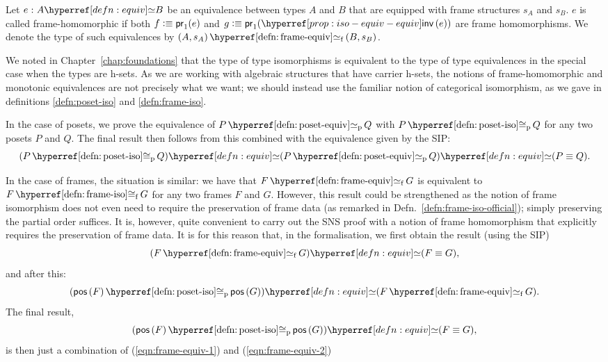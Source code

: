 \begin{defn}\label{defn:frame-equiv}
  Let $\oftyI{e}{\typequiv{A}{B}}$ be an equivalence between types $A$ and $B$ that are
  equipped with frame structures $s_A$ and $s_B$. $e$ is called frame-homomorphic if both
  $f \vcentcolon\equiv \mathsf{pr}_1(e)$ and $g \is \mathsf{pr}_1(\invequiv{e})$ are frame
  homomorphisms. We denote the type of such equivalences by
  $\frameequiv{(A, s_A)}{(B , s_B)}$.
\end{defn}

We noted in Chapter~\ref{chap:foundations} that the type of type isomorphisms is
equivalent to the type of type equivalences in the special case when the types are h-sets.
As we are working with algebraic structures that have carrier h-sets, the notions of
frame-homomorphic and monotonic equivalences are not precisely what we want; we should
instead use the familiar notion of categorical isomorphism, as we gave in definitions
\ref{defn:poset-iso} and \ref{defn:frame-iso}.

In the case of posets, we prove the equivalence of $\posetequiv{P}{Q}$ with
$\posetiso{P}{Q}$ for any two posets $P$ and $Q$. The final result then follows from this
combined with the equivalence given by the SIP:
\begin{equation*}
  \typequiv{(\posetiso{P}{Q})}{\typequiv{(\posetequiv{P}{Q})}{(P \equiv Q)}}.
\end{equation*}

In the case of frames, the situation is similar: we have that $\frameequiv{F}{G}$ is
equivalent to $\frameiso{F}{G}$ for any two frames $F$ and $G$. However, this result could
be strengthened as the notion of frame isomorphism does not even need to require the
preservation of frame data (as remarked in Defn.~\ref{defn:frame-iso-official}); simply
preserving the partial order suffices. It is, however, quite convenient to carry out the
SNS proof with a notion of frame homomorphism that explicitly requires the preservation of
frame data. It is for this reason that, in the \veragda{} formalisation, we first obtain
the result (using the SIP)
\begin{equation}\label{eqn:frame-equiv-1}
  \typequiv{(\frameequiv{F}{G})}{(F \equiv G)},
\end{equation}
and after this:
\begin{equation}\label{eqn:frame-equiv-2}
  \typequiv{(\posetiso{\posof{F}}{\posof{G}})}{(\frameequiv{F}{G})}.
\end{equation}
The final result,
\begin{equation}\label{eqn:frame-equiv-3}
  \typequiv{(\posetiso{\posof{F}}{\posof{G}})}{(F \equiv G)},
\end{equation}
is then just a combination of (\ref{eqn:frame-equiv-1}) and (\ref{eqn:frame-equiv-2})

